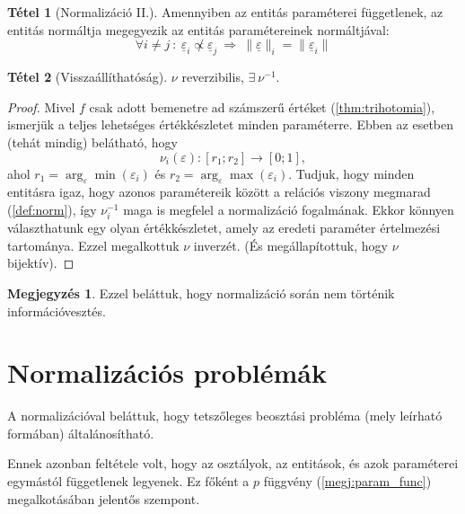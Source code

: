 \documentclass{article}
\theoremstyle{definition}
\newtheorem{theorem}{Tétel}[section]
\newtheorem*{megj}{Megjegyzés}
\newcommand{\vect}[1]{ \underline{#1} }
\newcommand{\norm}[1]{ \parallel {#1} \parallel }
\begin{document}
\begin{multicols}{2}
    \begin{theorem}[Normalizáció II.]
        Amennyiben az entitás paraméterei függetlenek, az entitás normáltja megegyezik az entitás paramétereinek normáltjával:
        \begin{equation}
            \forall i \neq j \ : \ 
            \vect\varepsilon_i \not \propto \vect\varepsilon_j 
            \ \Longrightarrow \
            \norm{\vect\varepsilon}_i = \norm{\vect\varepsilon_i}
        \end{equation}
    \end{theorem}
    
    \begin{theorem}[Visszaállíthatóság]
        $\nu$ reverzibilis, $\exists \ \nu^{-1}$.
        
        \begin{proof}
            Mivel $f$ csak adott bemenetre ad számszerű értéket (\ref{thm:trihotomia}), ismerjük a teljes lehetséges értékkészletet minden paraméterre. Ebben az esetben (tehát mindig) belátható, hogy 
            $$ \nu_i(\varepsilon) : [r_1; r_2] \to [0; 1], $$
            ahol $r_1 = \arg_\varepsilon\min(\varepsilon_i)$ és $r_2 = \arg_\varepsilon\max(\varepsilon_i)$.
            Tudjuk, hogy minden entitásra igaz, hogy azonos paramétereik között a relációs viszony megmarad (\ref{def:norm}), így $\nu_i^{-1}$ maga is megfelel a normalizáció fogalmának. Ekkor könnyen választhatunk egy olyan értékkészletet, amely az eredeti paraméter értelmezési tartománya. Ezzel megalkottuk $\nu$ inverzét. (És megállapítottuk, hogy $\nu$ bijektív).
        \end{proof}
        \begin{megj}
            Ezzel beláttuk, hogy normalizáció során nem történik információvesztés.
        \end{megj}
    \end{theorem}
    
\section{Normalizációs problémák}
    A normalizációval beláttuk, hogy tetszőleges beosztási probléma (mely leírható \az{(\ref{def:problema})} formában) általánosítható. 
    
    Ennek azonban feltétele volt, hogy az osztályok, az entitások, és azok paraméterei egymástól függetlenek legyenek. Ez főként a $p$ függvény (\ref{megj:param_func}) megalkotásában jelentős szempont.
    

\end{multicols}
\end{document}
